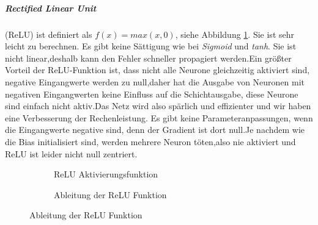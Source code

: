 \documentclass[12pt,a4paper]{scrartcl}
\numberwithin{equation}{section}
\begin{document}
\subparagraph{Rectified Linear Unit}(ReLU) ist definiert als $f(x)= max(x,0) $, siehe Abbildung \ref{fig:relu}. Sie ist sehr leicht zu berechnen. Es gibt keine Sättigung wie bei \textit{Sigmoid} und \textit{tanh}. Sie ist nicht linear,deshalb kann den Fehler schneller propagiert werden.Ein größter Vorteil der ReLU-Funktion ist, dass nicht alle Neurone gleichzeitig aktiviert sind, negative Eingangwerte werden zu null,daher hat die Ausgabe von Neuronen mit negativen Eingangwerten keine Einfluss auf die Schichtausgabe, diese Neurone sind einfach nicht aktiv.Das Netz wird also spärlich und effizienter und wir haben eine Verbesserung der Rechenleistung.
Es gibt keine Parameteranpassungen, wenn die Eingangwerte negative sind, denn der Gradient ist dort null.Je nachdem wie die Bias initialisiert sind, werden mehrere Neuron töten,also nie aktiviert und ReLU ist leider nicht null zentriert. 
\begin{figure}[h]
	\caption{ReLU Aktivierungsfunktion}
	\begin{subfigure}{.5\textwidth}
		\centering
		\caption{ReLU Aktivierungsfunktion}
		
	\end{subfigure}%
	\begin{subfigure}{.5\textwidth}
		\centering
		\caption{Ableitung der ReLU Funktion}
		
	\end{subfigure}
	\label{fig:relu}
\end{figure}
\end{document}
